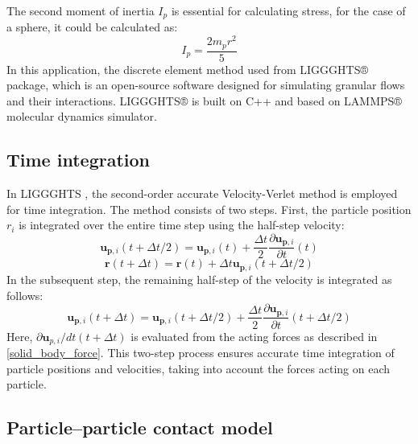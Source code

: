 The second moment of inertia $I_p$ is essential for calculating stress, for the case of a sphere, it could be calculated as:
\begin{equation}
I_{p}=\frac{2 m_{p} r^{2}}{5}
\end{equation}
In this application, the discrete element method used from LIGGGHTS® package, which is an open-source software designed for simulating granular flows and their interactions. LIGGGHTS® is built on C++ and based on LAMMPS® molecular dynamics simulator.

\subsection{Time integration}

In LIGGGHTS \cite{kloss2011liggghts}, the second-order accurate Velocity-Verlet method is employed for time integration. The method consists of two steps. First, the particle position $r_i$ is integrated over the entire time step using the half-step velocity:
\begin{equation}
\mathbf{u}_{\mathbf{p},i}(t+\Delta t / 2)=\mathbf{u}_{\mathbf{p},i}(t)+\frac{\Delta t}{2} \frac{\partial \mathbf{u}_{\mathbf{p},i}}{\partial t}(t)
\end{equation}
\begin{equation}
\mathbf{r}(t+\Delta t)=\mathbf{r}(t)+\Delta t \mathbf{u}_{\mathbf{p},i}(t+\Delta t / 2)
\end{equation}
In the subsequent step, the remaining half-step of the velocity is integrated as follows:
\begin{equation}
\mathbf{u}_{\mathbf{p},i}(t+\Delta t)=\mathbf{u}_{\mathbf{p},i}(t+\Delta t / 2)+\frac{\Delta t}{2} \frac{\partial \mathbf{u}_{\mathbf{p},i}}{\partial t}(t+\Delta t / 2)
\end{equation}
Here, $\partial \mathbf{u}_{p,i}/dt(t+\Delta t)$ is evaluated from the acting forces as described in \ref{solid_body_force}. This two-step process ensures accurate time integration of particle positions and velocities, taking into account the forces acting on each particle.

\subsection{Particle–particle contact model}

